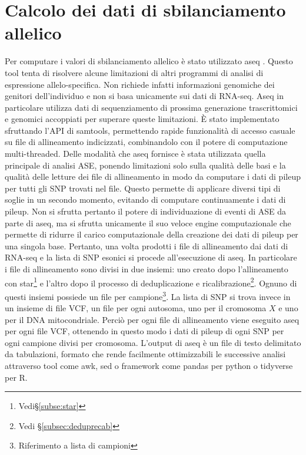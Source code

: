   \section{Calcolo dei dati di sbilanciamento allelico}
  \label{sec:aseq}
  Per computare i valori di sbilanciamento allelico \`e stato utilizzato aseq \cite{aseq}.
  Questo tool tenta di risolvere alcune limitazioni di altri programmi di analisi di espressione allelo-specifica.
  Non richiede infatti informazioni genomiche dei genitori dell'individuo e non si basa unicamente sui dati di RNA-seq.
  Aseq in particolare utilizza dati di sequenziamento di prossima generazione trascrittomici e genomici accoppiati per superare queste limitazioni.
  \`E stato implementato sfruttando l'API di samtools, permettendo rapide funzionalit\`a di accesso casuale su file di allineamento indicizzati, combinandolo con il potere di computazione multi-threaded.
  Delle modalit\`a che aseq fornisce \`e stata utilizzata quella principale di analisi ASE, ponendo limitazioni solo sulla qualit\`a delle basi e la qualit\`a delle letture dei file di allineamento in modo da computare i dati di pileup per tutti gli SNP trovati nel file.
  Questo permette di applicare diversi tipi di soglie in un secondo momento, evitando di computare continuamente i dati di pileup.
  Non si sfrutta pertanto il potere di individuazione di eventi di ASE da parte di aseq, ma si sfrutta unicamente il suo veloce engine computazionale che permette di ridurre il carico computazionale della creazione dei dati di pileup per una singola base.
  Pertanto, una volta prodotti i file di allineamento dai dati di RNA-seq e la lista di SNP esonici si procede all'esecuzione di aseq.
  In particolare i file di allineamento sono divisi in due insiemi: uno creato dopo l'allineamento con star\footnote{Vedi\S\ref{subse:star}} e l'altro dopo il processo di deduplicazione e ricalibrazione\footnote{Vedi \S\ref{subsec:deduprecab}}.
  Ognuno di questi insiemi possiede un file per campione\footnote{Riferimento a lista di campioni}.
  La lista di SNP si trova invece in un insieme di file VCF, un file per ogni autosoma, uno per il cromosoma $X$ e uno per il DNA mitocondriale.
  Perci\`o per ogni file di allineamento viene eseguito aseq per ogni file VCF, ottenendo in questo modo i dati di pileup di ogni SNP per ogni campione divisi per cromosoma.
  L'output di aseq \`e un file di testo delimitato da tabulazioni, formato che rende facilmente ottimizzabili le successive analisi attraverso tool come awk, sed o framework come pandas per python o tidyverse per R.
  
